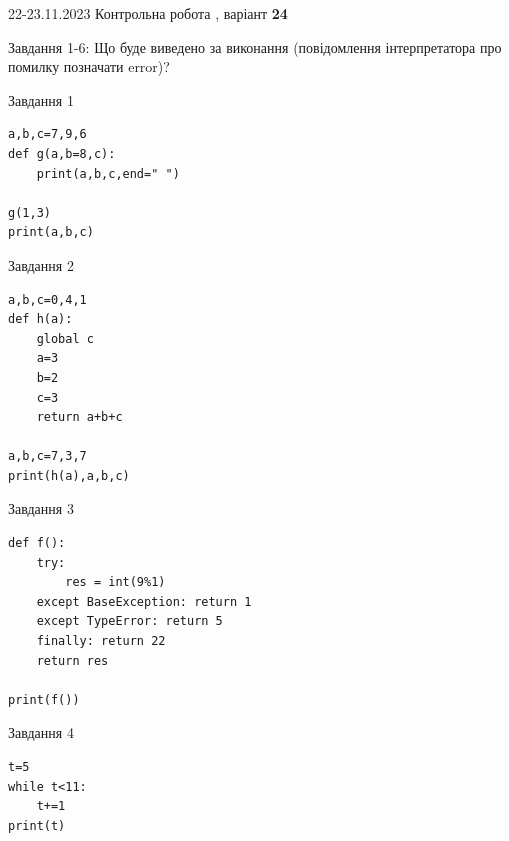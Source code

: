 \documentclass[12pt, ukrainian]{article}
\begin{document}
{{22-23.11.2023 Контрольна робота , варіант  \No \textbf { 24 }\par}}
{

Завдання 1-6: Що буде виведено за виконання (повідомлення інтерпретатора про помилку позначати error)?


\begin{minipage}[t]{9.7cm}                
{\begin{center}Завдання {1}\end{center}}
\begin{verbatim}
a,b,c=7,9,6
def g(a,b=8,c):
    print(a,b,c,end=" ")

g(1,3)
print(a,b,c)
\end{verbatim}     
\end{minipage}
\vline \hspace{8mm}
\begin{minipage}[t]{8.0cm}                
{\begin{center}Завдання {2}\end{center}}
\begin{verbatim}
a,b,c=0,4,1
def h(a):
    global c
    a=3
    b=2
    c=3
    return a+b+c

a,b,c=7,3,7
print(h(a),a,b,c)
\end{verbatim}     
\end{minipage}

\vspace{15mm}
\begin{minipage}[t]{9.7cm}                
{\begin{center}Завдання {3}\end{center}}
\begin{verbatim}
def f():
    try:
        res = int(9%1)
    except BaseException: return 1
    except TypeError: return 5
    finally: return 22
    return res

print(f())
\end{verbatim}     
\end{minipage}
\vline \hspace{8mm}
\begin{minipage}[t]{8.0cm}                
{\begin{center}Завдання {4}\end{center}}
\begin{verbatim}
t=5
while t<11:
    t+=1
print(t)
\end{verbatim}     
\end{minipage}

}
\end{document}

